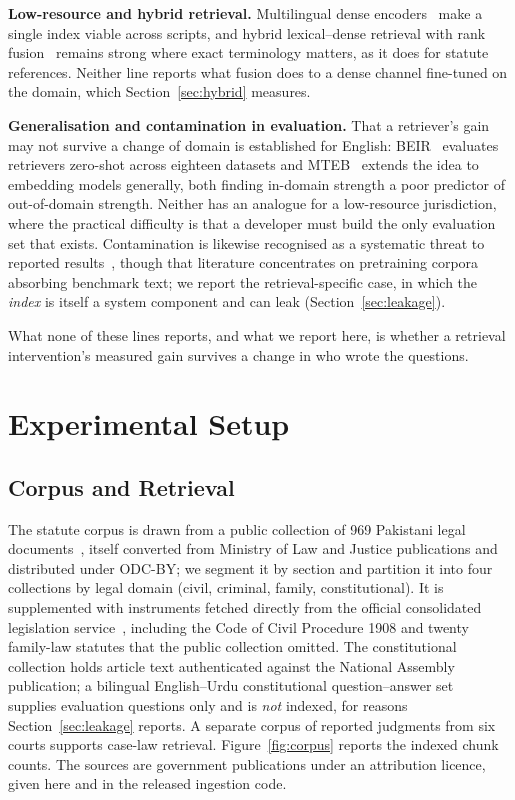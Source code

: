 \documentclass[conference]{IEEEtran}
\begin{document}
\textbf{Low-resource and hybrid retrieval.}
Multilingual dense encoders~\cite{wang2024multilinguale5} make a single index
viable across scripts, and hybrid lexical--dense retrieval with rank
fusion~\cite{robertson2009bm25,cormack2009rrf} remains strong where exact
terminology matters, as it does for statute references. Neither line reports
what fusion does to a dense channel fine-tuned on the domain, which
Section~\ref{sec:hybrid} measures.

\textbf{Generalisation and contamination in evaluation.}
That a retriever's gain may not survive a change of domain is established for
English: BEIR~\cite{thakur2021beir} evaluates retrievers zero-shot across
eighteen datasets and MTEB~\cite{muennighoff2023mteb} extends the idea to
embedding models generally, both finding in-domain strength a poor predictor of
out-of-domain strength. Neither has an analogue for a low-resource jurisdiction,
where the practical difficulty is that a developer must build the only
evaluation set that exists. Contamination is likewise recognised as a systematic
threat to reported results~\cite{magar2022contamination,sainz2023contamination},
though that literature concentrates on pretraining corpora absorbing benchmark
text; we report the retrieval-specific case, in which the \emph{index} is itself
a system component and can leak (Section~\ref{sec:leakage}).

What none of these lines reports, and what we report here, is whether a
retrieval intervention's measured gain survives a change in who wrote the
questions.

\section{Experimental Setup}
\label{sec:setup}

\subsection{Corpus and Retrieval}
\label{sec:retrieval}
The statute corpus is drawn from a public collection of 969 Pakistani legal
documents~\cite{paklaws}, itself converted from Ministry of Law and Justice
publications and distributed under ODC-BY; we segment it by section and
partition it into four collections by legal domain (civil, criminal, family,
constitutional). It is supplemented with instruments fetched directly from the
official consolidated legislation service~\cite{pakistancode}, including the
Code of Civil Procedure 1908 and twenty family-law statutes that the public
collection omitted. The constitutional collection holds article text
authenticated against the National Assembly publication; a bilingual
English--Urdu constitutional question--answer set~\cite{legaluqa} supplies
evaluation questions only and is \emph{not} indexed, for reasons
Section~\ref{sec:leakage} reports. A separate corpus of reported judgments
from six courts supports case-law retrieval. Figure~\ref{fig:corpus} reports the
indexed chunk counts. The sources are government publications under an
attribution licence, given here and in the released ingestion code.
\end{document}
